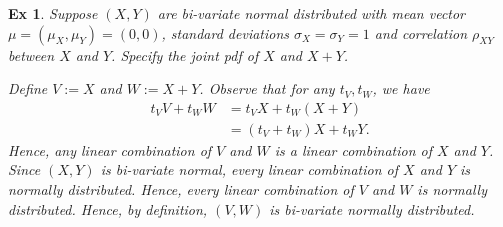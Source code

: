 \documentclass[a4paper,11pt]{article}
\newtheorem{exercise}[theorem]{Ex}
\begin{document}
\begin{exercise}
Suppose $(X,Y)$ are bi-variate normal distributed with mean vector $\mu = (\mu_X, \mu_Y) = (0,0)$, standard deviations $\sigma_X = \sigma_Y = 1$ and correlation $\rho_{X Y}$ between $X$ and $Y$. Specify the joint pdf of $X$ and $X + Y$.
\begin{solution}
Define $V := X$ and $W := X + Y$. Observe that for any $t_V, t_W$, we have
\begin{align}
    t_V V + t_W W &= t_V X + t_W (X + Y) \\
    &= (t_V + t_W) X + t_W Y.
\end{align}
Hence, any linear combination of $V$ and $W$ is a linear combination of $X$ and $Y$. Since $(X,Y)$ is bi-variate normal, every linear combination of $X$ and $Y$ is normally distributed. Hence, every linear combination of $V$ and $W$ is normally distributed. Hence, by definition, $(V,W)$ is bi-variate normally distributed.


\end{solution}
\end{exercise}
\end{document}

